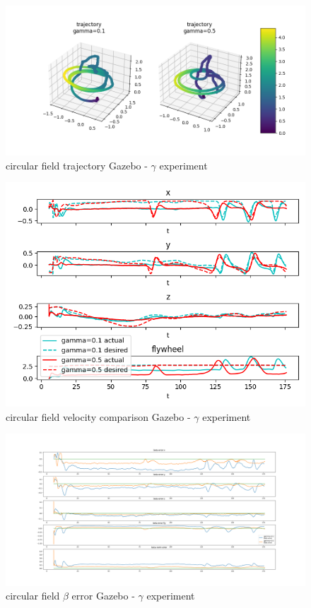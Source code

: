\begin{figure}[h!]
   \centering
   \includegraphics[width=\linewidth]{Images/gazebo_trajectory_gamma_circular.png}
   \caption{circular field trajectory Gazebo - $\gamma$ experiment}
   \label{fig:trajgazebocirculargamma}
\end{figure}
\begin{figure}[h!]
   \centering
   \includegraphics[width=\linewidth]{Images/gazebo_circular_gamma_V.png}
   \caption{circular field velocity comparison Gazebo - $\gamma$ experiment}
   \label{fig:velgazebocirculargamma}
\end{figure}
\begin{figure}[h!]
   \centering
   \includegraphics[width=\linewidth]{Images/gazebo_betaerror_gamma_circular.png}
   \caption{circular field $\beta$ error Gazebo - $\gamma$ experiment}
   \label{fig:betaerrorgazebocirculargamma}
\end{figure}
